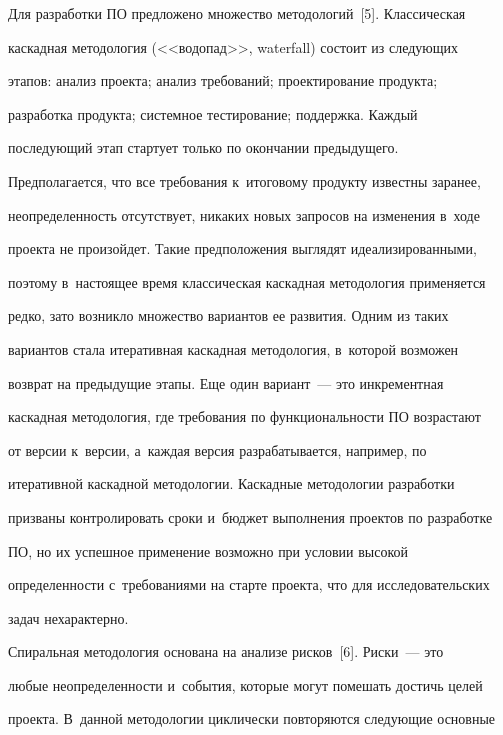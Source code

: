   


  Для разработки ПО предложено множество методологий~[5]. Классическая 


каскадная методология (<<водопад>>, waterfall) со\-сто\-ит из сле\-ду\-ющих 


этапов: анализ проекта; анализ требований; проектирование продукта; 


разработка продукта; сис\-тем\-ное тес\-ти\-ро\-ва\-ние; под\-держ\-ка. Каж\-дый 


по\-сле\-ду\-ющий этап стартует только по окончании предыду\-ще\-го. 


Предполагается, что все требования к~итоговому продукту из\-вест\-ны заранее, 


не\-опре\-де\-лен\-ность отсутствует, никаких новых запросов на изменения в~ходе 


проекта не произойдет. Такие предположения выглядят идеализированными, 


поэтому в~на\-сто\-ящее время классическая кас\-кад\-ная методология применяется 


редко, зато возникло множество вариантов ее развития. Одним из таких 


вариантов стала итеративная каскадная методология, в~которой возможен 


воз\-врат на предыдущие этапы. Еще один вариант~--- это инкрементная 


кас\-кад\-ная методология, где требования по функ\-цио\-наль\-ности ПО возрастают 


от версии к~версии, а~каж\-дая версия разрабатывается, например, по 


итеративной каскадной методологии. Каскадные методологии разработки 


при\-зва\-ны контролировать сроки и~бюд\-жет выполнения проектов по разработке 


ПО, но их успеш\-ное применение воз\-мож\-но при условии высокой 


оп\-ре\-де\-лен\-ности с~требованиями на стар\-те проекта, что для исследовательских 


задач не\-ха\-рак\-терно. 


  


  Спиральная методология основана на анализе рис\-ков~[6]. Риски~--- это 


любые не\-оп\-ре\-де\-лен\-ности и~события, которые могут помешать достичь целей 


проекта. В~данной методологии цик\-ли\-че\-ски повторяются сле\-ду\-ющие основные 


